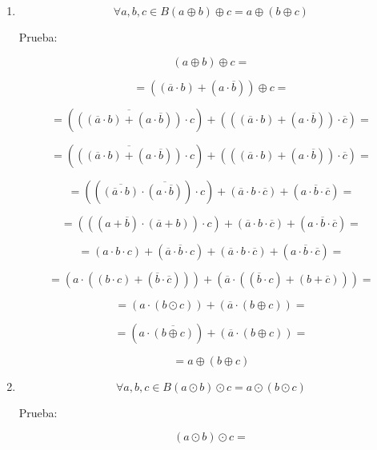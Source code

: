 \begin{enumerate}
\begin{enumerate}
\begin{enumerate}
      \begin{enumerate}
      \def\labelenumiv{\arabic{enumiv}.}
      \item
        \[\forall a,b,{c \in B}{({a \oplus b})} \oplus {c = a} \oplus {({b \oplus c})}\]

        Prueba:

        \[{({a \oplus b})} \oplus {c =}\]

        \[{= {({{({\overline{a} \cdot b})} + {({a \cdot \overline{b}})}})}} \oplus {c =}\]

        \[{= {{({\overline{({{({\overline{a}\cdot b})}+{({a\cdot\overline{b}})}})} \cdot c})} + {({{({{({\overline{a} \cdot b})} + {({a \cdot \overline{b}})}})} \cdot \overline{c}})}}} =\]

        \[{= {{({\overline{({{({\overline{a}\cdot b})}+{({a\cdot\overline{b}})}})} \cdot c})} + {({{({{({\overline{a} \cdot b})} + {({a \cdot \overline{b}})}})} \cdot \overline{c}})}}} =\]

        \[{= {{{({{({\overline{({\overline{a}\cdot b})} \cdot \overline{({a\cdot\overline{b}})}})} \cdot c})} + {({{\overline{a} \cdot b} \cdot \overline{c}})}} + {({{a \cdot \overline{b}} \cdot \overline{c}})}}} =\]

        \[{= {{{({{({{({a + \overline{b}})} \cdot {({\overline{a} + b})}})} \cdot c})} + {({{\overline{a} \cdot b} \cdot \overline{c}})}} + {({{a \cdot \overline{b}} \cdot \overline{c}})}}} =\]

        \[{= {{{{({{a \cdot b} \cdot c})} + {({{\overline{a} \cdot \overline{b}} \cdot c})}} + {({{\overline{a} \cdot b} \cdot \overline{c}})}} + {({{a \cdot \overline{b}} \cdot \overline{c}})}}} =\]

        \[{= {{({a \cdot {({{({b \cdot c})} + {({\overline{b} \cdot \overline{c}})}})}})} + {({\overline{a} \cdot {({{({\overline{b} \cdot c})} + {({b + \overline{c}})}})}})}}} =\]

        \[{= {{({a \cdot {({b \odot c})}})} + {({\overline{a} \cdot {({b \oplus c})}})}}} =\]

        \[{= {{({a \cdot \overline{({b\oplus c})}})} + {({\overline{a} \cdot {({b \oplus c})}})}}} =\]

        \[{= a} \oplus {({b \oplus c})}\]
      \item
        \[\forall a,b,{c \in B}{({a \odot b})} \odot {c = a} \odot {({b \odot c})}\]

        Prueba:

        \[{({a \odot b})} \odot {c =}\]


\end{enumerate}
\end{enumerate}
\end{enumerate}
\end{enumerate}
